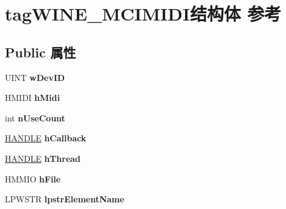 \hypertarget{structtag_w_i_n_e___m_c_i_m_i_d_i}{}\section{tag\+W\+I\+N\+E\+\_\+\+M\+C\+I\+M\+I\+D\+I结构体 参考}
\label{structtag_w_i_n_e___m_c_i_m_i_d_i}
\subsection*{Public 属性}
\begin{DoxyCompactItemize}
\item 
\mbox{\label{structtag_w_i_n_e___m_c_i_m_i_d_i_adae38483f5a1b61cf5d49fa5ee380fdf}} 
U\+I\+NT {\bfseries w\+Dev\+ID}
\item 
\mbox{\label{structtag_w_i_n_e___m_c_i_m_i_d_i_a460a20464c4d64e57b520e9218b768e9}} 
H\+M\+I\+DI {\bfseries h\+Midi}
\item 
\mbox{\label{structtag_w_i_n_e___m_c_i_m_i_d_i_a84eaa00812393ec3db6d51719fcbfdc1}} 
int {\bfseries n\+Use\+Count}
\item 
\mbox{\label{structtag_w_i_n_e___m_c_i_m_i_d_i_aa10af1644a98344434048a0b24f420b4}} 
\hyperlink{interfacevoid}{H\+A\+N\+D\+LE} {\bfseries h\+Callback}
\item 
\mbox{\label{structtag_w_i_n_e___m_c_i_m_i_d_i_a85f56a8328fec798ec5921525e90b50f}} 
\hyperlink{interfacevoid}{H\+A\+N\+D\+LE} {\bfseries h\+Thread}
\item 
\mbox{\label{structtag_w_i_n_e___m_c_i_m_i_d_i_a75a9f4e8032bed31c29852c93c781705}} 
H\+M\+M\+IO {\bfseries h\+File}
\item 
\mbox{\label{structtag_w_i_n_e___m_c_i_m_i_d_i_ad83a4e6b31ac9ed376156510c7d83eed}} 
L\+P\+W\+S\+TR {\bfseries lpstr\+Element\+Name}
\item 
\mbox{\label{structtag_w_i_n_e___m_c_i_m_i_d_i_a73e6ab3189017a0f4d5dbbad159bfdfc}} 

\end{DoxyCompactItemize}
